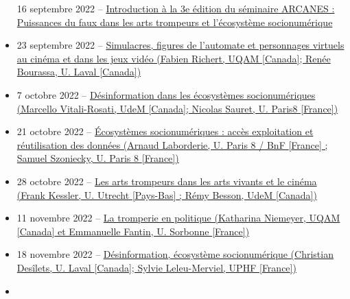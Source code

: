\documentclass[
  a4paper,
  DIV=11,
  numbers=noendperiod]{scrreprt}
\begin{document}
\begin{itemize}
  16 septembre 2022 --
  \href{https://crilcq.arcanes.ca/event/introduction-a-la-3e-edition-du-seminaire-arcanes-puissances-du-faux-dans-les-arts-trompeurs-et-lecosysteme-socionumerique/}{Introduction
  à la 3e édition du séminaire ARCANES : Puissances du faux dans les
  arts trompeurs et l'écosystème socionumérique}
\item
  23 septembre 2022 --
  \href{https://crilcq.arcanes.ca/event/simulacres-figures-de-lautomate-et-personnages-virtuels-au-cinema-et-dans-les-jeux-video-fabien-richert-uqam-canada-renee-bourassa-u-laval-canada/}{Simulacres,
  figures de l'automate et personnages virtuels au cinéma et dans les
  jeux vidéo (Fabien Richert, UQAM {[}Canada{]}; Renée Bourassa, U.
  Laval {[}Canada{]})}
\item
  7 octobre 2022 --
  \href{https://crilcq.arcanes.ca/event/desinformation-dans-les-ecosystemes-socionumeriques-marcello-vitali-rosati-udem-canada-invite-e-a-confirmer/}{Désinformation
  dans les écosystèmes socionumériques (Marcello Vitali-Rosati, UdeM
  {[}Canada{]}; Nicolas Sauret, U. Paris8 {[}France{]})}
\item
  21 octobre 2022 --
  \href{https://crilcq.arcanes.ca/event/acces-exploitation-et-reutilisation-des-donnees-patrimoniales-de-la-bnf-arnaud-laborderie-bnf-u-paris8-france-invite-e-a-confirmer/}{Écosystèmes
  socionumériques : accès exploitation et réutilisation des données
  (Arnaud Laborderie, U. Paris 8 / BnF {[}France{]} ; Samuel Szoniecky,
  U. Paris 8 {[}France{]})}
\item
  28 octobre 2022 --
  \href{https://crilcq.arcanes.ca/event/les-arts-trompeurs-dans-les-arts-vivants-et-le-cinema-frank-kessler-u-utrecht-pays-bas-sabine-lenk-u-antwerp-belgique-invite-e-a-confirmer/}{Les
  arts trompeurs dans les arts vivants et le cinéma (Frank Kessler, U.
  Utrecht {[}Pays-Bas{]} ; Rémy Besson, UdeM {[}Canada{]})}
\item
  11 novembre 2022 --
  \href{https://crilcq.arcanes.ca/event/les-arts-trompeurs-dans-la-litterature-katharina-niemeyer-uqam-canada-emmanuelle-fantin-u-sorbonne-france/}{La
  tromperie en politique (Katharina Niemeyer, UQAM {[}Canada{]} et
  Emmanuelle Fantin, U. Sorbonne {[}France{]})}
\item
  18 novembre 2022 --
  \href{https://crilcq.arcanes.ca/event/desinformation-ecosysteme-socionumerique-christian-desilets-u-laval-canada-invite-e-a-confirmer/}{Désinformation,
  écosystème socionumérique (Christian Desîlets, U. Laval {[}Canada{]};
  Sylvie Leleu-Merviel, UPHF {[}France{]})}
\item

\end{itemize}
\end{document}
